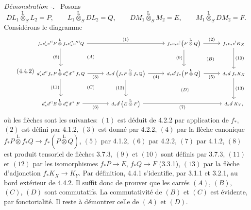 \documentclass[11pt]{article}
\newenvironment{prooftext}[1][Proof]{\par\noindent\emph{#1.}\ }{\par\medskip}
\begin{document}
\begin{prooftext}[Démonstration -]
Posons
\[
DL_1\overset{\mathrm{L}}{\otimes}_SL_2=P,\qquad
L_1\overset{\mathrm{L}}{\otimes}_SDL_2=Q,\qquad
DM_1\overset{\mathrm{L}}{\otimes}_SM_2=E,\qquad
M_1\overset{\mathrm{L}}{\otimes}_SDM_2=F.
\]
Considérons le diagramme
\begin{equation}
\tag{4.4.2}
\begin{tikzcd}[column sep=2.6em,row sep=2.6em,cells={nodes={font=\scriptsize}},every label/.append style={font=\scriptsize}]
f_*c'_*c'{}^!P\overset{\mathrm{L}}{\otimes} f_*c''_*c''{}^!Q
  \arrow[rr,"(1)"] \arrow[d,"(8)"'] &&
f_*c_*c^!\bigl(P\overset{\mathrm{L}}{\otimes}Q\bigr)
  \arrow[r,"(2)"] \arrow[d,"(9)"'] &
f_*c_*c^!K_X \arrow[d,"(10)"]\\
d'_*d'{}^!f_*P\overset{\mathrm{L}}{\otimes}d''_*d''{}^!f_*Q
  \arrow[r,"(3)"'] \arrow[d,"(11)"'] &
d_*d^!\bigl(f_*P\overset{\mathrm{L}}{\otimes}f_*Q\bigr)
  \arrow[r,"(4)"'] \arrow[d,"(12)"'] &
d_*d^!f_*\bigl(P\overset{\mathrm{L}}{\otimes}Q\bigr)
  \arrow[r,"(5)"'] &
d_*d^!f_*K_X \arrow[d,"(13)"]\\
d'_*d'{}^!E\overset{\mathrm{L}}{\otimes}d''_*d''{}^!F
  \arrow[r,"(6)"'] &
d_*d^!\bigl(E\overset{\mathrm{L}}{\otimes}F\bigr)
  \arrow[rr,"(7)"'] &&
d_*d^!K_Y,
\arrow[from=1-1,to=2-2, phantom, "\scriptstyle (A)"]
\arrow[from=1-3,to=2-4, phantom, "\scriptstyle (B)"]
\arrow[from=2-1,to=3-2, phantom, "\scriptstyle (C)"]
\arrow[from=2-2,to=3-4, phantom, "\scriptstyle (D)"]
\end{tikzcd}
\end{equation}
où les
flèches sont les suivantes: $(1)$ est déduit de 4.2.2 par application de $f_*$, $(2)$ est défini par 4.1.2, $(3)$ est donné par 4.2.2, $(4)$ par la flèche canonique $f_*P\overset{\mathrm{L}}{\otimes}f_*Q\longrightarrow f_*(P\overset{\mathrm{L}}{\otimes}Q)$, $(5)$ par 4.1.2, $(6)$ par 4.2.2, $(7)$ par 4.1.2, $(8)$ est produit tensoriel de flèches 3.7.3, $(9)$ et $(10)$ sont définis par 3.7.3, $(11)$ et $(12)$ par les isomorphismes $f_*P\longrightarrow E$, $f_*Q\longrightarrow F$ (3.3.1), $(13)$ par la flèche d'adjonction $f_*K_X\longrightarrow K_Y$. Par définition, 4.4.1 s'identifie, par 3.1.1 et 3.2.1, au bord extérieur de 4.4.2. Il suffit donc de prouver que les carrés $(A)$, $(B)$, $(C)$, $(D)$ sont commutatifs. La commutativité de $(B)$ et $(C)$ est évidente, par fonctorialité. Il reste à démontrer celle de $(A)$ et $(D)$.


\end{prooftext}
\end{document}
